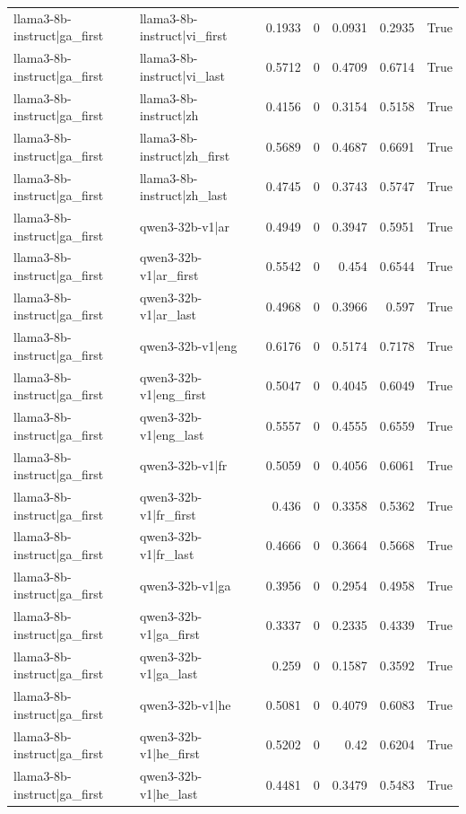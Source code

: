 \begin{table}
\begin{tabular}{l l r r r r l}
llama3-8b-instruct|ga_first & llama3-8b-instruct|vi_first & 0.1933 & 0 & 0.0931 & 0.2935 & True \\
llama3-8b-instruct|ga_first & llama3-8b-instruct|vi_last & 0.5712 & 0 & 0.4709 & 0.6714 & True \\
llama3-8b-instruct|ga_first & llama3-8b-instruct|zh & 0.4156 & 0 & 0.3154 & 0.5158 & True \\
llama3-8b-instruct|ga_first & llama3-8b-instruct|zh_first & 0.5689 & 0 & 0.4687 & 0.6691 & True \\
llama3-8b-instruct|ga_first & llama3-8b-instruct|zh_last & 0.4745 & 0 & 0.3743 & 0.5747 & True \\
llama3-8b-instruct|ga_first & qwen3-32b-v1|ar & 0.4949 & 0 & 0.3947 & 0.5951 & True \\
llama3-8b-instruct|ga_first & qwen3-32b-v1|ar_first & 0.5542 & 0 & 0.454 & 0.6544 & True \\
llama3-8b-instruct|ga_first & qwen3-32b-v1|ar_last & 0.4968 & 0 & 0.3966 & 0.597 & True \\
llama3-8b-instruct|ga_first & qwen3-32b-v1|eng & 0.6176 & 0 & 0.5174 & 0.7178 & True \\
llama3-8b-instruct|ga_first & qwen3-32b-v1|eng_first & 0.5047 & 0 & 0.4045 & 0.6049 & True \\
llama3-8b-instruct|ga_first & qwen3-32b-v1|eng_last & 0.5557 & 0 & 0.4555 & 0.6559 & True \\
llama3-8b-instruct|ga_first & qwen3-32b-v1|fr & 0.5059 & 0 & 0.4056 & 0.6061 & True \\
llama3-8b-instruct|ga_first & qwen3-32b-v1|fr_first & 0.436 & 0 & 0.3358 & 0.5362 & True \\
llama3-8b-instruct|ga_first & qwen3-32b-v1|fr_last & 0.4666 & 0 & 0.3664 & 0.5668 & True \\
llama3-8b-instruct|ga_first & qwen3-32b-v1|ga & 0.3956 & 0 & 0.2954 & 0.4958 & True \\
llama3-8b-instruct|ga_first & qwen3-32b-v1|ga_first & 0.3337 & 0 & 0.2335 & 0.4339 & True \\
llama3-8b-instruct|ga_first & qwen3-32b-v1|ga_last & 0.259 & 0 & 0.1587 & 0.3592 & True \\
llama3-8b-instruct|ga_first & qwen3-32b-v1|he & 0.5081 & 0 & 0.4079 & 0.6083 & True \\
llama3-8b-instruct|ga_first & qwen3-32b-v1|he_first & 0.5202 & 0 & 0.42 & 0.6204 & True \\
llama3-8b-instruct|ga_first & qwen3-32b-v1|he_last & 0.4481 & 0 & 0.3479 & 0.5483 & True \\

\end{tabular}
\end{table}
